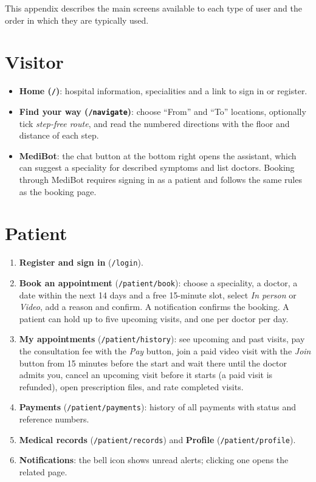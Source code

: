 This appendix describes the main screens available to each type of user and the order in which they are typically used.

\section{Visitor}

\begin{itemize}
    \item \textbf{Home (\texttt{/})}: hospital information, specialities and a link to sign in or register.
    \item \textbf{Find your way (\texttt{/navigate})}: choose ``From'' and ``To'' locations, optionally tick \emph{step-free route}, and read the numbered directions with the floor and distance of each step.
    \item \textbf{MediBot}: the chat button at the bottom right opens the assistant, which can suggest a speciality for described symptoms and list doctors. Booking through MediBot requires signing in as a patient and follows the same rules as the booking page.
\end{itemize}

\section{Patient}

\begin{enumerate}
    \item \textbf{Register and sign in} (\texttt{/login}).
    \item \textbf{Book an appointment} (\texttt{/patient/book}): choose a speciality, a doctor, a date within the next 14 days and a free 15-minute slot, select \emph{In person} or \emph{Video}, add a reason and confirm. A notification confirms the booking. A patient can hold up to five upcoming visits, and one per doctor per day.
    \item \textbf{My appointments} (\texttt{/patient/history}): see upcoming and past visits, pay the consultation fee with the \emph{Pay} button, join a paid video visit with the \emph{Join} button from 15 minutes before the start and wait there until the doctor admits you, cancel an upcoming visit before it starts (a paid visit is refunded), open prescription files, and rate completed visits.
    \item \textbf{Payments} (\texttt{/patient/payments}): history of all payments with status and reference numbers.
    \item \textbf{Medical records} (\texttt{/patient/records}) and \textbf{Profile} (\texttt{/patient/profile}).
    \item \textbf{Notifications}: the bell icon shows unread alerts; clicking one opens the related page.
\end{enumerate}

